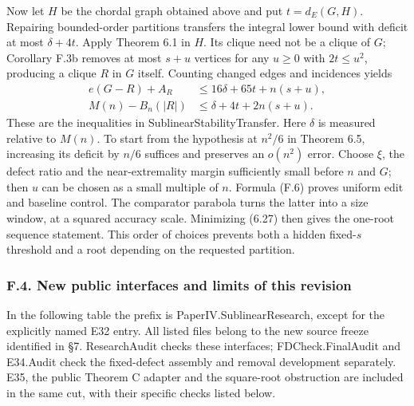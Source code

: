 \documentclass[english,11pt,a4paper]{article}
\begin{document}
Now let \(H\) be the chordal graph obtained above and put \(t=d_E(G,H)\). Repairing bounded-order partitions transfers the integral lower bound with deficit at most \(\delta+4t\). Apply Theorem 6.1 in \(H\). Its clique need not be a clique of \(G\); Corollary F.3b removes at most \(s+u\) vertices for any \(u\ge0\) with \(2t\le u^2\), producing a clique \(R\) in \(G\) itself. Counting changed edges and incidences yields \[
\begin{aligned}
e(G-R)+A_R&\le16\delta+65t+n(s+u),\\
M(n)-B_n(|R|)&\le\delta+4t+2n(s+u).
\end{aligned}
\tag{F.6}
\] These are the inequalities in {\ttfamily\small SublinearSta\discretionary{\hbox{\ensuremath{\hookrightarrow}}}{}{}bilityTransf\discretionary{\hbox{\ensuremath{\hookrightarrow}}}{}{}er}. Here \(\delta\) is measured relative to \(M(n)\). To start from the hypothesis at \(n^2/6\) in Theorem 6.5, increasing its deficit by \(n/6\) suffices and preserves an \(o(n^2)\) error. Choose \(\xi\), the defect ratio and the near-extremality margin sufficiently small before \(n\) and \(G\); then \(u\) can be chosen as a small multiple of \(n\). Formula (F.6) proves uniform edit and baseline control. The comparator parabola turns the latter into a size window, at a squared accuracy scale. Minimizing (6.27) then gives the one-root sequence statement. This order of choices prevents both a hidden fixed-\(s\) threshold and a root depending on the requested partition.

\subsubsection{F.4. New public interfaces and limits of this revision}\label{f.4.-new-public-interfaces-and-limits-of-this-revision}

In the following table the prefix is {\ttfamily\small PaperIV.\discretionary{\hbox{\ensuremath{\hookrightarrow}}}{}{}SublinearRes\discretionary{\hbox{\ensuremath{\hookrightarrow}}}{}{}earch}, except for the explicitly named E32 entry. All listed files belong to the new source freeze identified in §7. {\ttfamily\small ResearchAudi\discretionary{\hbox{\ensuremath{\hookrightarrow}}}{}{}t} checks these interfaces; {\ttfamily\small FDCheck.\discretionary{\hbox{\ensuremath{\hookrightarrow}}}{}{}FinalAudit} and {\ttfamily\small E34.\discretionary{\hbox{\ensuremath{\hookrightarrow}}}{}{}Audit} check the fixed-defect assembly and removal development separately. E35, the public Theorem C adapter and the square-root obstruction are included in the same cut, with their specific checks listed below.
\end{document}
